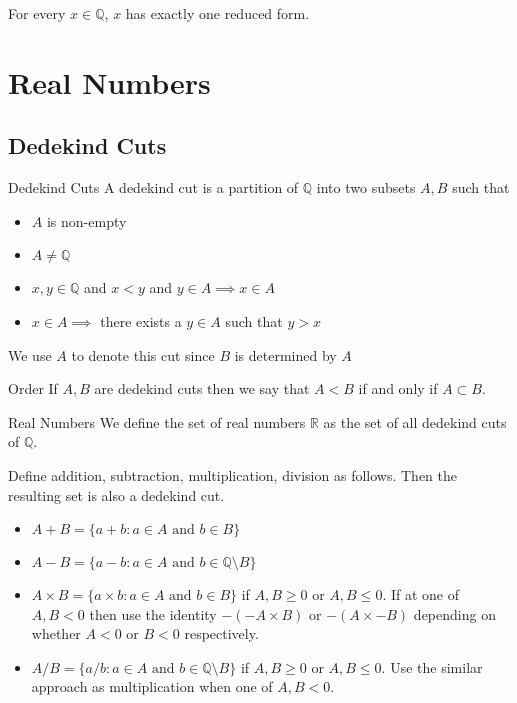 \documentclass[a4paper]{article}
\begin{document}
\begin{thm}{}{} For every $x\in\mathbb{Q}$, $x$ has exactly one reduced form. 
\end{thm}

\pagebreak
\section{Real Numbers}
\subsection{Dedekind Cuts}
\begin{defn}{Dedekind Cuts}{} A dedekind cut is a partition of $\mathbb{Q}$ into two subsets $A,B$ such that
\begin{itemize}
\item $A$ is non-empty
\item $A\neq\mathbb{Q}$
\item $x,y\in\mathbb{Q}$ and $x<y$ and $y\in A\implies x\in A$
\item $x\in A\implies$ there exists a $y\in A$ such that $y>x$
\end{itemize}
We use $A$ to denote this cut since $B$ is determined by $A$
\end{defn}

\begin{defn}{Order}{} If $A,B$ are dedekind cuts then we say that $A<B$ if and only if $A\subset B$. 
\end{defn}

\begin{defn}{Real Numbers}{} We define the set of real numbers $\mathbb{R}$ as the set of all dedekind cuts of $\mathbb{Q}$. 
\end{defn}

\begin{prp}{}{} Define addition, subtraction, multiplication, division as follows. Then the resulting set is also a dedekind cut. 
\begin{itemize}
\item $A+B=\{a+b:a\in A\text{ and }b\in B\}$
\item $A-B=\{a-b:a\in A\text{ and }b\in \mathbb{Q}\setminus B\}$
\item $A\times B=\{a\times b:a\in A\text{ and }b\in B\}$ if $A,B\geq 0$ or $A,B\leq 0$. If at one of $A,B<0$ then use the identity $-(-A\times B)$ or $-(A\times -B)$ depending on whether $A<0$ or $B<0$ respectively. 
\item $A/B=\{a/b:a\in A\text{ and }b\in \mathbb{Q}\setminus B\}$ if $A,B\geq 0$ or $A,B\leq 0$. Use the similar approach as multiplication when one of $A,B<0$. 
\end{itemize}
\end{prp}
\end{document}
